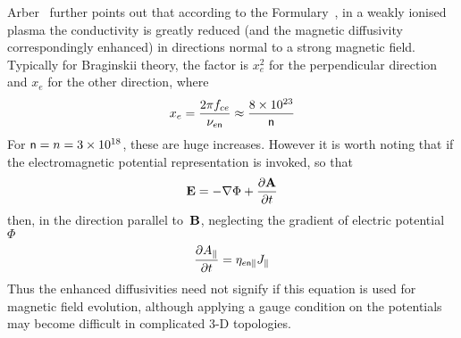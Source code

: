 Arber~\cite{Le06emer,Ar07Emer} further points out that
according to the Formulary~\cite{NRLpf07},
in a weakly ionised plasma
the conductivity is greatly reduced (and the magnetic diffusivity
correspondingly enhanced) in directions normal to a strong magnetic field.
Typically for Braginskii theory, the
factor is $x_e^2$ for the perpendicular direction and $x_e$ for
the other direction, where
\begin{equation}
x_e=\frac{2\pi f_{ce}}{\nu_{e{\sf n}}} \approx \frac{8 \times 10^{23}}{{\sf n}}
\end{equation}
For ${\sf n}=n=3 \times 10^{18}$, these are huge increases. However it is worth
noting that if the electromagnetic potential representation is invoked, so that
\begin{equation}\label{eq:E}
{\bf E} = -\nabla \Phi + \frac{\partial {\bf A}}{\partial t}
\end{equation}
then, in the direction parallel to~${\bf B}$, neglecting the gradient of
electric potential~$\Phi$
\begin{equation}\label{eq:A}
\frac{\partial  A_{\parallel}}{\partial t}=\eta_{e {\sf n}\parallel} J_{\parallel}
\end{equation}
Thus the enhanced diffusivities need not signify if this equation is used for
magnetic field evolution, although applying a gauge condition on the potentials
may become difficult in complicated 3-D topologies.

